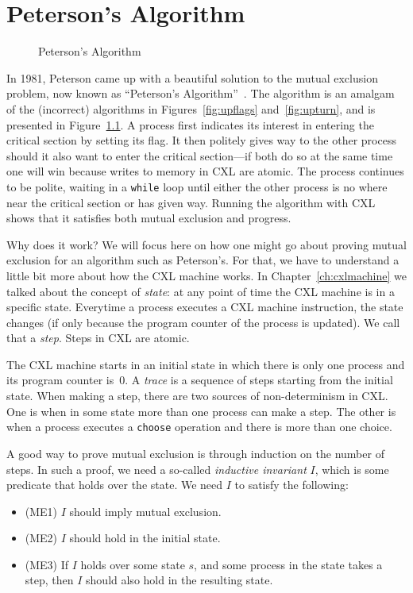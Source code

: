 \documentclass{report}
\newenvironment{code}{
\tcolorbox
}{
\endtcolorbox
}
\begin{document}
\chapter{Peterson's Algorithm}
\label{ch:peterson}

\begin{figure}
\begin{code}

\end{code}
\caption{Peterson's Algorithm}
\label{fig:peterson}
\end{figure}

In 1981, Peterson came up with a beautiful solution to the mutual exclusion
problem, now known as ``Peterson's Algorithm''~\cite{Peterson81}.
The algorithm is an amalgam of the (incorrect) algorithms in
Figures~\ref{fig:upflags} and~\ref{fig:upturn}, and is presented
in Figure~\ref{fig:peterson}.
A process first indicates its interest in entering the critical section
by setting its flag.
It then politely gives way to the other process should it also want to
enter the critical section---if both do so at the same time one will
win because writes to memory in CXL are atomic.
The process continues to be polite, waiting in a \texttt{while} loop
until either the other process is no where near the critical section
or has given way.
Running the algorithm with CXL shows that it satisfies both mutual
exclusion and progress.

Why does it work?  We will focus here on how one might go about proving
mutual exclusion for an algorithm such as Peterson's.
For that, we have to understand a little bit more about how the CXL
machine works.
In Chapter~\ref{ch:cxlmachine} we talked about the concept of \emph{state}:
at any point of time the CXL machine is in a specific state.
Everytime a process executes a CXL machine instruction, the
state changes (if only because the program counter of the process is
updated).  We call that a \emph{step}.  Steps in CXL are atomic.

The CXL machine starts in an initial state in which there is only
one process and its program counter is~0.  A \emph{trace} is a
sequence of steps starting from the initial state.  When making a
step, there are two sources of non-determinism in CXL.  One is when
in some state more than one process can make a step.  The other is
when a process executes a \texttt{choose} operation and there is
more than one choice.

A good way to prove mutual exclusion is through induction on
the number of steps.
In such a proof, we need a so-called
\emph{inductive invariant} $I$, which is some predicate that holds
over the state.  We need $I$ to satisfy the following:
\begin{itemize}
\item (ME1) $I$ should imply mutual exclusion.
\item (ME2) $I$ should hold in the initial state.
\item (ME3) If $I$ holds over some state $s$, and some process in the
state takes a step, then $I$ should also hold in the resulting state.
\end{itemize}
\end{document}
